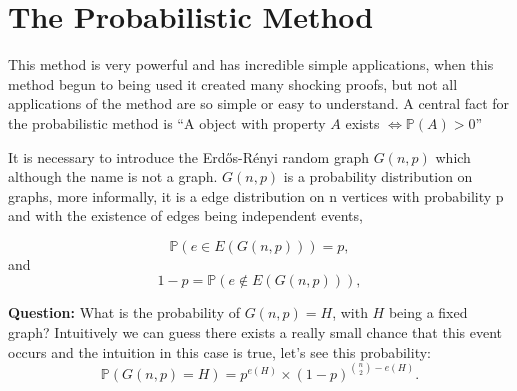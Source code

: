 \documentclass[12pt,twoside,a4paper]{book}
\numberwithin{equation}{section}
\theoremstyle{remark}
\begin{document}
\section{The Probabilistic Method}
This method is very powerful and has incredible simple applications, when this method begun to being used it created many shocking proofs, but not all applications of the method are so simple or easy to understand. A central fact for the probabilistic method is ``A object with property $ A$ exists $\iff  \mathbb{P}(A)>0$''

It is necessary to introduce the Erd\H{o}s-Rényi random graph $G(n,p)$ which although the name is not a graph. $G(n,p)$ is a probability distribution on graphs, more informally, it is a edge distribution on n vertices with probability p and with the existence of edges being independent events,

$$\mathbb{P}(e \in E(G(n,p)))=p ,$$
and
$$ 1-p=\mathbb{P}(e \notin E(G(n,p))),$$

{\bf Question:} What is the probability of $G(n,p) = H$, with $H$ being a fixed graph?
Intuitively we can guess there exists a really small chance that this event occurs and the intuition in this case is true, let's see this probability:
$$\mathbb{P}(G(n,p)=H) = p^{e(H)}\times (1-p)^{\binom{n}{2}-e(H)}.$$
\end{document}
